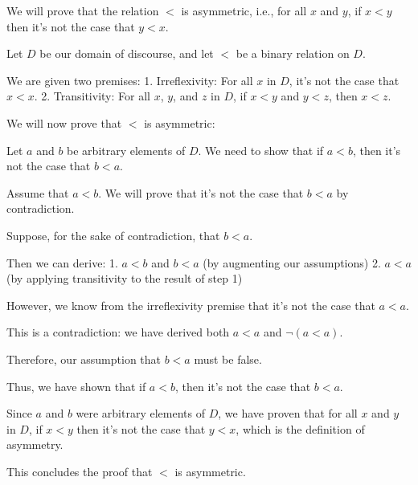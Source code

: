 \documentclass[a4paper]{article}
\begin{document}
We will prove that the relation $<$ is asymmetric, i.e., for all $x$ and $y$, if $x < y$ then it's not the case that $y < x$.

Let $D$ be our domain of discourse, and let $<$ be a binary relation on $D$.

We are given two premises:
1. Irreflexivity: For all $x$ in $D$, it's not the case that $x < x$.
2. Transitivity: For all $x$, $y$, and $z$ in $D$, if $x < y$ and $y < z$, then $x < z$.

We will now prove that $<$ is asymmetric:

Let $a$ and $b$ be arbitrary elements of $D$. We need to show that if $a < b$, then it's not the case that $b < a$.

Assume that $a < b$. We will prove that it's not the case that $b < a$ by contradiction.

Suppose, for the sake of contradiction, that $b < a$.

Then we can derive:
1. $a < b$ and $b < a$ (by augmenting our assumptions)
2. $a < a$ (by applying transitivity to the result of step 1)

However, we know from the irreflexivity premise that it's not the case that $a < a$.

This is a contradiction: we have derived both $a < a$ and $\neg(a < a)$.

Therefore, our assumption that $b < a$ must be false.

Thus, we have shown that if $a < b$, then it's not the case that $b < a$.

Since $a$ and $b$ were arbitrary elements of $D$, we have proven that for all $x$ and $y$ in $D$, if $x < y$ then it's not the case that $y < x$, which is the definition of asymmetry.

This concludes the proof that $<$ is asymmetric.
\end{document}
